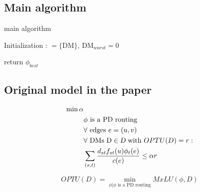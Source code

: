 \documentclass{ctexart}
\begin{document}
\subsection{Main algorithm} 
\begin{algorithm}[H]
    \SetAlgoLined 
	\caption{main algorithm}%
	Initialization :  $ = \{\text{DM}\} $, DM$_{worst} = 0 $\; 

	return $\phi_{best}$
\end{algorithm}


\subsection{Original model in the paper} 
\begin{equation}
	\begin{aligned}
		\min \alpha & \\
		& \phi \text{ is a PD routing}\\
		& \forall \text{ edges }e=(u,v) \\
		& \forall \text{ DMs D}\in \text{\sl D}\text{ with }OPTU(D)=r:\\
		& \sum_{(s,t)}\frac{d_{st}f_{st}(u)\phi_t(e)}{c(e)}\leq\alpha r
	\end{aligned}
\end{equation}

\begin{equation}
	OPTU(D)=\min_{\phi|\phi\text{ is a PD routing}} MxLU(\phi,D)
\end{equation}
\end{document}
